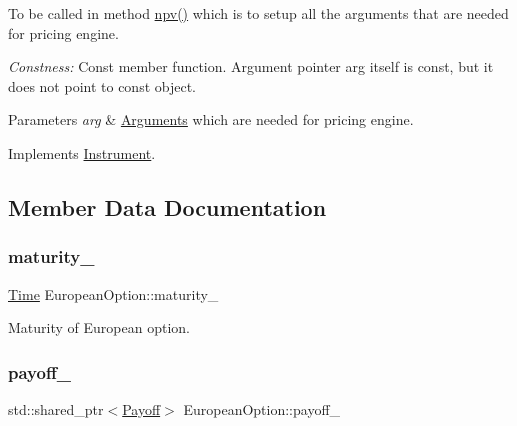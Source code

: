 To be called in method \hyperlink{class_instrument_aa750f2ae95a21d65a073da3171e8d084}{npv()} which is to setup all the arguments that are needed for pricing engine. 

{\itshape Constness\+:} Const member function. Argument pointer arg itself is const, but it does not point to const object. 
\begin{DoxyParams}{Parameters}
{\em arg} & \hyperlink{class_european_option_1_1_arguments}{Arguments} which are needed for pricing engine. \\
\hline
\end{DoxyParams}


Implements \hyperlink{class_instrument_a5cd384be384fe415f09ecc78e2a87539}{Instrument}.



\subsection{Member Data Documentation}
\hypertarget{class_european_option_a8853b9bd1af9abc371630ae1c68f304c}{}\label{class_european_option_a8853b9bd1af9abc371630ae1c68f304c} 
\subsubsection{\texorpdfstring{maturity\+\_\+}{maturity\_}}
{\footnotesize\ttfamily \hyperlink{_name_def_8h_ac2d3e0ba793497bcca555c7c2cf64ff3}{Time} European\+Option\+::maturity\+\_\+\hspace{0.3cm}{\ttfamily [private]}}



Maturity of European option. 

\hypertarget{class_european_option_a3d597cb0b811f69a08e49b1af13b5a04}{}\label{class_european_option_a3d597cb0b811f69a08e49b1af13b5a04} 
\subsubsection{\texorpdfstring{payoff\+\_\+}{payoff\_}}
{\footnotesize\ttfamily std\+::shared\+\_\+ptr$<$\hyperlink{class_payoff}{Payoff}$>$ European\+Option\+::payoff\+\_\+\hspace{0.3cm}{\ttfamily [private]}}



